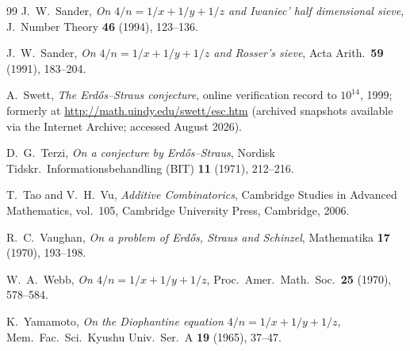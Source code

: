 \documentclass[11pt]{article}
\theoremstyle{plain}
\theoremstyle{remark}
\theoremstyle{plain}
\numberwithin{equation}{section}
\begin{document}
\begin{thebibliography}{99}
J.~W.~Sander,
\emph{On $4/n = 1/x + 1/y + 1/z$ and Iwaniec' half dimensional sieve},
J.~Number Theory \textbf{46} (1994), 123--136.

J.~W.~Sander,
\emph{On $4/n = 1/x + 1/y + 1/z$ and Rosser's sieve},
Acta Arith.\ \textbf{59} (1991), 183--204.

A.~Swett,
\emph{The Erd\H{o}s--Straus conjecture},
online verification record to $10^{14}$, 1999; formerly at
\url{http://math.uindy.edu/swett/esc.htm} (archived snapshots
available via the Internet Archive; accessed August 2026).

D.~G.~Terzi,
\emph{On a conjecture by Erd\H{o}s--Straus},
Nordisk Tidskr.\ Informationsbehandling (BIT) \textbf{11} (1971),
212--216.

T.~Tao and V.~H.~Vu,
\emph{Additive Combinatorics},
Cambridge Studies in Advanced Mathematics, vol.~105,
Cambridge University Press, Cambridge, 2006.

R.~C.~Vaughan,
\emph{On a problem of Erd\H{o}s, Straus and Schinzel},
Mathematika \textbf{17} (1970), \mbox{193--198}.

W.~A.~Webb,
\emph{On $4/n = 1/x + 1/y + 1/z$},
Proc.\ Amer.\ Math.\ Soc.\ \textbf{25} (1970), 578--584.

K.~Yamamoto,
\emph{On the Diophantine equation $4/n = 1/x + 1/y + 1/z$},
Mem.\ Fac.\ Sci.\ Kyushu Univ.\ Ser.~A \textbf{19} (1965), 37--47.

\end{thebibliography}
\end{document}
